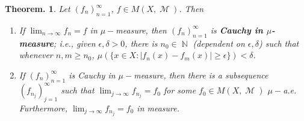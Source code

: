 \documentclass[11pt, a4paper]{memoir}
\DeclareMathOperator{\N}{{\mathbb{N}}}
\theoremstyle{change}
\newtheorem{theorem}{Theorem.}[section]
\theoremstyle{plain}
\theoremstyle{nonumberplain}
\DeclareMathOperator{\M}{{\mathcal{M}}}
\begin{document}
\begin{theorem}
    Let $(f_n)_{n=1}^\infty$, $f\in M(X,\M)$.
    Then
    \begin{enumerate}[nolistsep,label=(\roman*)]
        \item If $\lim_{n\to\infty}f_n=f$ in $\mu-$measure, then $(f_n)_{n=1}^\infty$ is \textbf{Cauchy in $\mu$-measure}; i.e., given $\epsilon,\delta>0$, there is $n_0\in\N$ (dependent on $\epsilon,\delta$) such that whenever $n,m\geq n_0$, $\mu(\{x\in X:|f_n(x)-f_m(x)|\geq\epsilon\})<\delta$.
        \item If $(f_n)_{n=1}^\infty$ is Cauchy in $\mu-$measure, then there is a subsequence $(f_{n_j})_{j=1}^\infty$ such that $\lim_{j\to\infty}f_{n_j}=f_0$ for some $f_0\in M(X,\M)$ $\mu-$a.e.
            Furthermore, $\lim_{j\to\infty}f_{n_j}=f_0$ in measure.
    \end{enumerate}
\end{theorem}
\end{document}
